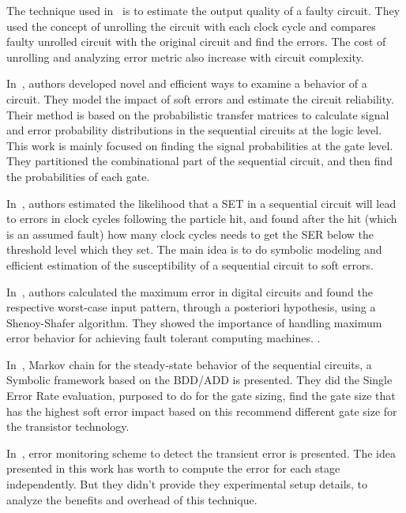 The technique used in~\citep{ranjan2014aslan} is to estimate the output quality of a faulty circuit. They used the concept
of unrolling the circuit with each clock cycle and compares faulty unrolled circuit with the original circuit and find the errors.
The cost of unrolling and analyzing error metric also increase
with circuit complexity.

In~\citep{yu2010scalable}, authors developed novel and efficient ways to examine a behavior of a circuit. They model the impact of soft errors and estimate the circuit reliability. Their method is based on the probabilistic transfer matrices to calculate signal and error probability distributions in the
sequential circuits at the logic level. This work is mainly focused on finding the signal probabilities at the gate level. They partitioned the combinational part of the sequential circuit, and then find the probabilities of each gate.


In~\citep{miskov2007mars},  authors estimated the likelihood that a SET in a sequential circuit will lead to errors
in clock cycles following the particle hit, and found after the hit (which is an assumed fault) how many clock
cycles needs to get the SER below the threshold level which they set. The main idea is to do symbolic modeling and efficient estimation of the susceptibility of a sequential circuit to soft errors.




In~\citep{lingasubramanian2010probabilistic}, authors calculated the maximum error in digital circuits and found the respective
worst-case input pattern, through a posteriori hypothesis, using a Shenoy-Shafer algorithm.
They showed the importance of handling maximum error behavior for achieving fault tolerant
computing machines. .

In~\citep{miskov2008modeling}, Markov chain for the steady-state behavior of the sequential circuits, a Symbolic framework
based on the BDD/ADD is presented. They did the Single Error Rate evaluation, purposed to do
for the gate sizing, find the gate size that has the highest soft error impact based on this recommend
different gate size for the transistor technology. 
 




In~\citep{das2007monitoring}, error monitoring scheme to detect the transient error is presented. The idea presented in this work has worth to compute the error for each stage
independently. But they didn't provide they experimental setup details, to analyze the benefits and overhead of this technique.

